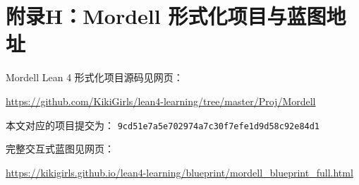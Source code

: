 \newpage
{}
\section*{附录H：Mordell 形式化项目与蓝图地址}
\begingroup
\setlength{\parindent}{0pt}
\setlength{\parskip}{0.35\baselineskip}

Mordell Lean 4 形式化项目源码见网页：

\url{https://github.com/KikiGirls/lean4-learning/tree/master/Proj/Mordell}

本文对应的项目提交为：
\texttt{9cd51e7a5e702974a7c30f7efe1d9d58c92e84d1}

完整交互式蓝图见网页：

\url{https://kikigirls.github.io/lean4-learning/blueprint/mordell_blueprint_full.html}

\endgroup
